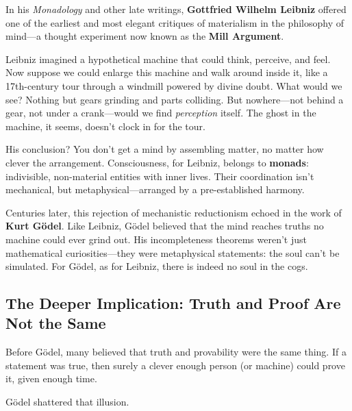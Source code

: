 \begin{tcolorbox}[title={\textbf{Historical Sidebar: No Soul in the Cogs — Leibniz’s Mill Argument}}, colback=gray!5, colframe=black, fonttitle=\bfseries]

  In his \textit{Monadology} and other late writings, \textbf{Gottfried Wilhelm Leibniz} offered one of the earliest and most elegant critiques of materialism in the philosophy of mind—a thought experiment now known as the \textbf{Mill Argument}.
  
  Leibniz imagined a hypothetical machine that could think, perceive, and feel. Now suppose we could enlarge this machine and walk around inside it, like a 17th-century tour through a windmill powered by divine doubt. What would we see? Nothing but gears grinding and parts colliding. But nowhere—not behind a gear, not under a crank—would we find \textit{perception} itself. The ghost in the machine, it seems, doesn’t clock in for the tour.
  
  His conclusion? You don’t get a mind by assembling matter, no matter how clever the arrangement. Consciousness, for Leibniz, belongs to \textbf{monads}: indivisible, non-material entities with inner lives. Their coordination isn’t mechanical, but metaphysical—arranged by a pre-established harmony.
  
  Centuries later, this rejection of mechanistic reductionism echoed in the work of \textbf{Kurt Gödel}. Like Leibniz, Gödel believed that the mind reaches truths no machine could ever grind out. His incompleteness theorems weren’t just mathematical curiosities—they were metaphysical statements: the soul can’t be simulated. For Gödel, as for Leibniz, there is indeed no soul in the cogs.
\end{tcolorbox}










\medskip

\subsection{The Deeper Implication: Truth and Proof Are Not the Same}

Before Gödel, many believed that truth and provability were the same thing. If a statement was true, then surely a clever enough person (or machine) could prove it, given enough time.

Gödel shattered that illusion.

